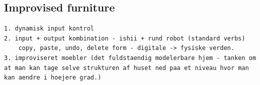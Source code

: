 \subsection{Improvised furniture}
\label{ch:jamming:concepts:improvised_furniture}



\begin{verbatim}
1. dynamisk input kontrol
2. input + output kombination - ishii + rund robot (standard verbs)
	copy, paste, undo, delete form - digitale -> fysiske verden.
3. improviseret moebler (det fuldstaendig modelerbare hjem - tanken om at man kan tage selve strukturen af huset ned paa et niveau hvor man kan aendre i hoejere grad.)

\end{verbatim}

